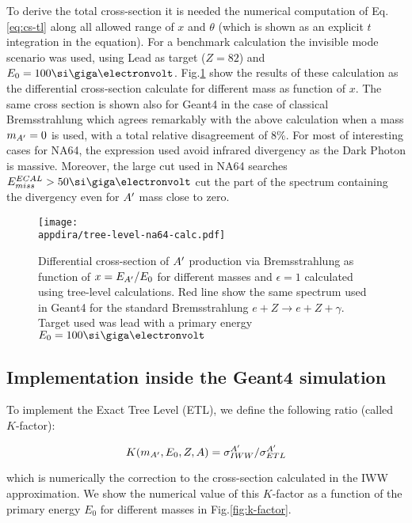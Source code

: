 To derive the total cross-section it is needed the numerical computation of Eq.\ref{eq:cs-tl} along all allowed range of $x$ and $\theta$ (which is shown as an explicit $t$ integration in the equation). For a benchmark calculation the invisible mode scenario was used, using Lead as target ($Z = 82$) and $E_0 = 100 \gev$. Fig.\ref{fig:dp-cs-tl} show the results of these calculation as the differential cross-section calculate for different mass as function of $x$. The same cross section is shown also for Geant4 in the case of classical Bremsstrahlung which agrees remarkably with the above calculation when a mass $m_{A'} = 0$ is used, with a total relative disagreement of 8\%. For most of interesting cases for NA64, the expression used avoid infrared divergency as the Dark Photon is massive. Moreover, the large cut used in NA64 searches $E^{ECAL}_{miss} > 50 \gev$ cut the part of the spectrum containing the divergency even for $A'$ mass close to zero.

\begin{figure}[bth!]
  \centering
  \texttt{[image: \\appdira/tree-level-na64-calc.pdf]}
  \caption[Tree level differential cross-section for different masses]{Differential cross-section of $A'$ production via Bremsstrahlung as function of $x=E_{A'}/E_0$ for different masses and $\epsilon = 1$ calculated using tree-level calculations. Red line show the same spectrum used in Geant4 for the standard Bremsstrahlung $e + Z \to e + Z + \gamma$. Target used was lead with a primary energy $E_0 = 100 \gev$ \cite{DMsimulation}}
  \label{fig:dp-cs-tl}
\end{figure}

\subsection{Implementation inside the Geant4 simulation}

To implement the Exact Tree Level (ETL), we define the following ratio (called $K$-factor):

\begin{equation}
  \label{eq:k-factor}
  K(m_{A'},E_0,Z,A) = \sigma^{A'}_{IWW} / \sigma^{A'}_{ETL}
\end{equation}

which is numerically the correction to the cross-section calculated in the IWW approximation. We show the numerical value of this $K$-factor as a function of the primary energy $E_0$ for different masses in Fig.\ref{fig:k-factor}.

